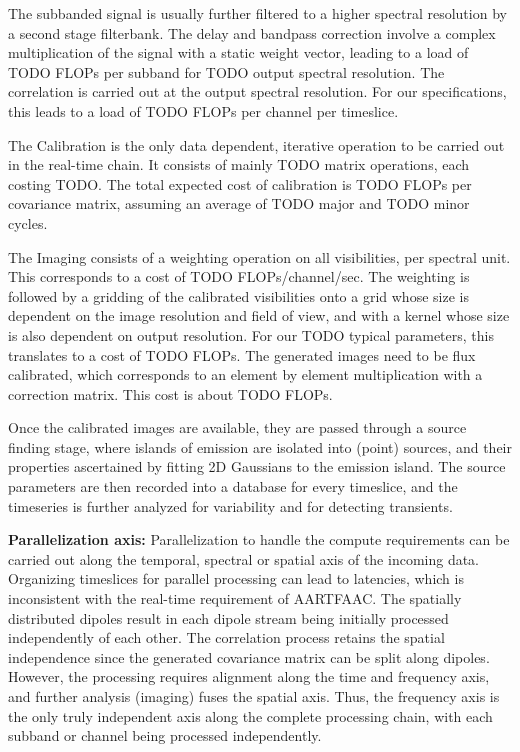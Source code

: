 \documentclass{ws-jai}
\begin{document}
The subbanded signal is usually further filtered to a higher spectral resolution
by  a second  stage  filterbank. The  delay and  bandpass  correction involve  a
complex multiplication of  the signal with a static weight  vector, leading to a
load  of  TODO FLOPs  per  subband  for  TODO  output spectral  resolution.  The
correlation  is  carried  out  at   the  output  spectral  resolution.  For  our
specifications, this leads to a load of TODO FLOPs per channel per timeslice.

The Calibration  is the only data  dependent, iterative operation to  be carried
out in the  real-time chain. It consists of mainly  TODO matrix operations, each
costing  TODO.  The  total  expected  cost of  calibration  is  TODO  FLOPs  per
covariance matrix, assuming an average of TODO major and TODO minor cycles.

The Imaging consists of a weighting  operation on all visibilities, per spectral
unit. This  corresponds to a  cost of  TODO FLOPs/channel/sec. The  weighting is
followed by a gridding of the calibrated  visibilities onto a grid whose size is
dependent on  the image resolution  and field of view,  and with a  kernel whose
size is  also dependent on output  resolution. For our TODO  typical parameters,
this translates to  a cost of TODO  FLOPs. The generated images need  to be flux
calibrated, which  corresponds to  an element by  element multiplication  with a
correction matrix. This cost is about TODO FLOPs.

Once  the calibrated  images are  available, they  are passed  through a  source
finding stage, where islands of emission  are isolated into (point) sources, and
their properties ascertained by fitting 2D Gaussians to the emission island. The
source parameters are then recorded into a database for every timeslice, and the
timeseries is further analyzed for variability and for detecting transients.

\noindent \textbf  {Parallelization axis:}  Parallelization to handle  the compute
requirements can be carried out along  the temporal, spectral or spatial axis of
the incoming  data.  Organizing timeslices  for parallel processing can  lead to
latencies, which is inconsistent with the real-time requirement of AARTFAAC. The
spatially  distributed dipoles  result  in each  dipole  stream being  initially
processed  independently of  each other.   The correlation  process retains  the
spatial independence  since the generated  covariance matrix can be  split along
dipoles.   However,  the  processing  requires  alignment  along  the  time  and
frequency axis,  and further analysis  (imaging) fuses the spatial  axis.  Thus,
the  frequency axis  is  the  only truly  independent  axis  along the  complete
processing chain, with each subband or channel being processed independently.
\end{document}
